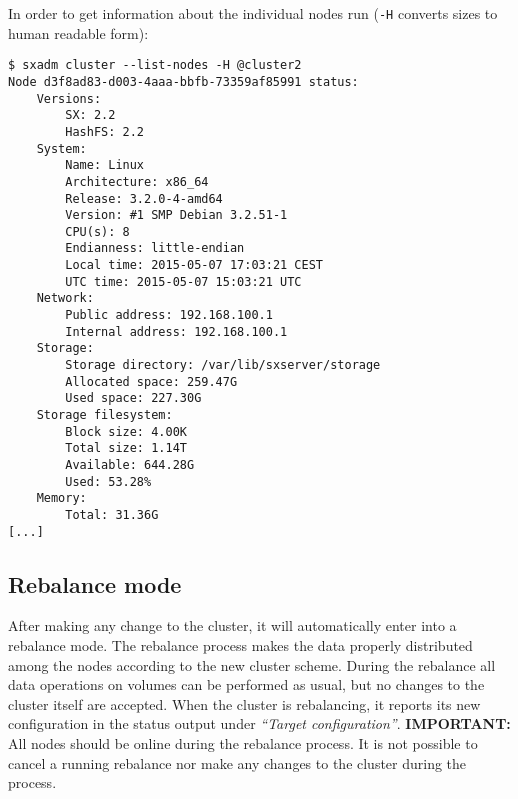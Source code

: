 In order to get information about the individual nodes run (\verb+-H+ converts
sizes to human readable form):
\begin{lstlisting}
$ sxadm cluster --list-nodes -H @cluster2
Node d3f8ad83-d003-4aaa-bbfb-73359af85991 status:
    Versions:
        SX: 2.2
        HashFS: 2.2
    System:
        Name: Linux
        Architecture: x86_64
        Release: 3.2.0-4-amd64
        Version: #1 SMP Debian 3.2.51-1
        CPU(s): 8
        Endianness: little-endian
        Local time: 2015-05-07 17:03:21 CEST
        UTC time: 2015-05-07 15:03:21 UTC
    Network:
        Public address: 192.168.100.1
        Internal address: 192.168.100.1
    Storage:
        Storage directory: /var/lib/sxserver/storage
        Allocated space: 259.47G
        Used space: 227.30G
    Storage filesystem:
        Block size: 4.00K
        Total size: 1.14T
        Available: 644.28G
        Used: 53.28%
    Memory:
        Total: 31.36G
[...]
\end{lstlisting}

\subsection{Rebalance mode}
After making any change to the cluster, it will automatically enter into
a rebalance mode. The rebalance process makes the data properly distributed
among the nodes according to the new cluster scheme. During the rebalance
all data operations on volumes can be performed as usual, but no changes
to the cluster itself are accepted. When the cluster is rebalancing, it
reports its new configuration in the status output under
\emph{``Target configuration''}. \textbf{IMPORTANT: } All nodes should be
online during the rebalance process. It is not possible to cancel a running
rebalance nor make any changes to the cluster during the process.

